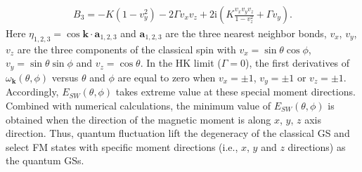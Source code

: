 \documentclass[aps,prb,reprint,amsfonts,amsmath,amssymb,showpacs,groupedaddress,superscriptaddress]{revtex4-1}
\begin{document}
\begin{align}
B_{3}=- K (1 - v_{y}^{2})- 2 \Gamma v_{x}v_{z}+ 2\text{i} (K \frac{v_{x} v_{y} v_{z}}{1-v_{z}^{2}} + \Gamma v_{y}). \nonumber
\end{align}
Here $\eta_{1,2,3} = \cos \bm{k} \cdot \bm{a}_{1,2,3}$ and $\bm{a}_{1,2,3}$ are the three nearest neighbor bonds, $v_x$, $v_y$, $v_z$ are the three components of the classical spin with $v_{x} = \sin \theta \cos \phi$, $v_{y} = \sin \theta \sin \phi$ and $v_{z} = \cos \theta$. In the HK limit ($\Gamma = 0$), the first derivatives of $\omega_{\bm{k}}(\theta, \phi)$ versus $\theta$ and $\phi$ are equal to zero when $v_{x} = \pm1$, $v_{y} = \pm1$ or $v_{z} = \pm1$. Accordingly, $E_{SW}(\theta, \phi)$ takes extreme value at these special moment directions. Combined with numerical calculations, the minimum value of $E_{SW}(\theta, \phi)$ is obtained when the direction of the magnetic moment is along $x$, $y$, $z$ axis direction. Thus, quantum fluctuation lift the degeneracy of the classical GS and select FM states with specific moment directions (i.e., $x$, $y$ and $z$ directions) as the quantum GSs.


\end{document}
